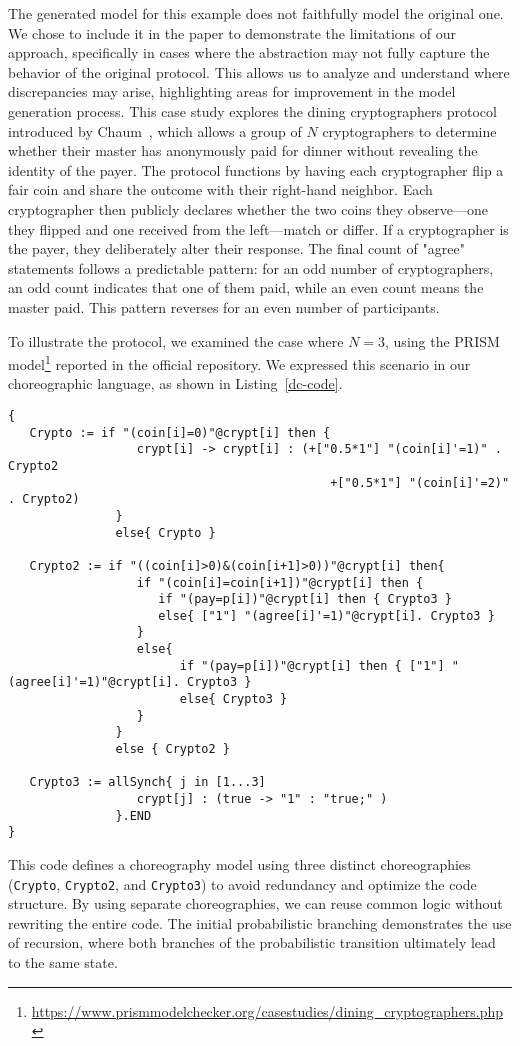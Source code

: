 The generated model for this example does not faithfully model the original one. We chose 
to include it in the paper to demonstrate the limitations of our approach, 
specifically in cases where the abstraction may not fully capture the behavior of the original protocol. 
This allows us to analyze and understand where discrepancies may arise, 
highlighting areas for improvement in the model generation process.
This case study explores the dining cryptographers protocol introduced by Chaum~\cite{Cha88}, which allows a group of $N$ cryptographers to determine whether their master has anonymously paid for dinner without revealing the identity of the payer. The protocol functions by having each cryptographer flip a fair coin and share the outcome with their right-hand neighbor. Each cryptographer then publicly declares whether the two coins they observe—one they flipped and one received from the left—match or differ. If a cryptographer is the payer, they deliberately alter their response. The final count of "agree" statements follows a predictable pattern: for an odd number of cryptographers, an odd count indicates that one of them paid, while an even count means the master paid. This pattern reverses for an even number of participants.

To illustrate the protocol, we examined the case where $N=3$, using the PRISM model\footnote{\url{https://www.prismmodelchecker.org/casestudies/dining_cryptographers.php}} reported in the official repository. We expressed this scenario in our choreographic language, as shown in Listing~\ref{dc-code}.
\begin{lstlisting}[style=chor-color,caption={Choreography for the Dining Cryptographers Protocol.},captionpos=b,label={dc-code}]
{
   Crypto := if "(coin[i]=0)"@crypt[i] then {
                  crypt[i] -> crypt[i] : (+["0.5*1"] "(coin[i]'=1)" . Crypto2
                                             +["0.5*1"] "(coin[i]'=2)" . Crypto2) 
               }
               else{ Crypto }

   Crypto2 := if "((coin[i]>0)&(coin[i+1]>0))"@crypt[i] then{
                  if "(coin[i]=coin[i+1])"@crypt[i] then {
                     if "(pay=p[i])"@crypt[i] then { Crypto3 }
                     else{ ["1"] "(agree[i]'=1)"@crypt[i]. Crypto3 }
                  }
                  else{
                        if "(pay=p[i])"@crypt[i] then { ["1"] "(agree[i]'=1)"@crypt[i]. Crypto3 }
                        else{ Crypto3 }
                  }
               }
               else { Crypto2 }

   Crypto3 := allSynch{ j in [1...3]
                  crypt[j] : (true -> "1" : "true;" )
               }.END
}
\end{lstlisting}
This code defines a choreography model using three distinct choreographies (\texttt{Crypto}, \texttt{Crypto2}, and \texttt{Crypto3}) to avoid redundancy and optimize the code structure. By using separate choreographies, we can reuse common logic without rewriting the entire code.
The initial probabilistic branching demonstrates the use of recursion, where both branches of the probabilistic transition ultimately lead to the same state. 

